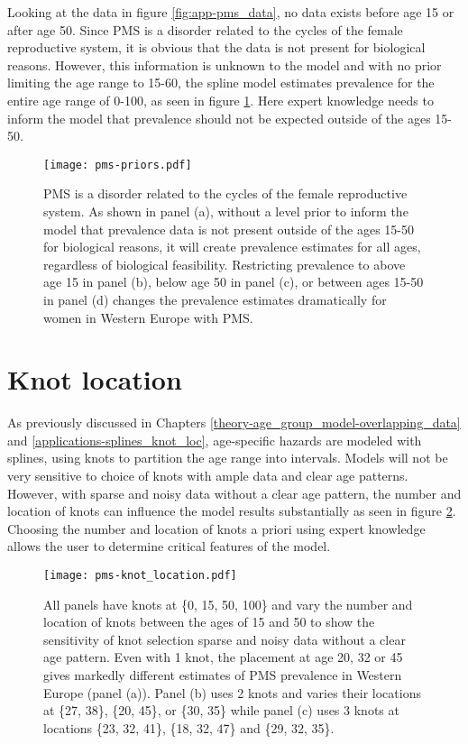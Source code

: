 Looking at the data in figure \ref{fig:app-pms_data}, no data exists before age 15 or after age 50.  Since PMS is a disorder related to the cycles of the female reproductive system, it is obvious that the data is not present for biological reasons.  However, this information is unknown to the model and with no prior limiting the age range to 15-60, the spline model estimates prevalence for the entire age range of 0-100, as seen in figure \ref{fig:app-prios_on_level}.  Here expert knowledge needs to inform the model that prevalence should not be expected outside of the ages 15-50.

    \begin{figure}
        \begin{center}
            \texttt{[image: pms-priors.pdf]}
        \end{center}
        \caption{PMS is a disorder related to the cycles of the female reproductive system.  As shown in panel (a), without a level prior to inform the model that prevalence data is not present outside of the ages 15-50 for biological reasons, it will create prevalence estimates for all ages, regardless of biological feasibility.  Restricting prevalence to above age 15 in panel (b), below age 50 in panel (c), or between ages 15-50 in panel (d) changes the prevalence estimates dramatically for women in Western Europe with PMS.}
        \label{fig:app-prios_on_level}
    \end{figure}

\section{Knot location}
As previously discussed in Chapters \ref{theory-age_group_model-overlapping_data} and \ref{applications-splines_knot_loc}, age-specific hazards are modeled with splines, using knots to partition the age range into intervals.  Models will not be very sensitive to choice of knots with ample data and clear age patterns.  However, with sparse and noisy data without a clear age pattern, the number and location of knots can influence the model results substantially as seen in figure \ref{fig:app-knot_loc}.  Choosing the number and location of knots a priori using expert knowledge allows the user to determine critical features of the model.

    \begin{figure}
        \begin{center}
            \texttt{[image: pms-knot\_location.pdf]}
        \end{center}
        \caption{All panels have knots at \{0, 15, 50, 100\} and vary the number and location of knots between the ages of 15 and 50 to show the sensitivity of knot selection sparse and noisy data without a clear age pattern. Even with 1 knot, the placement at age 20, 32 or 45 gives markedly different estimates of PMS prevalence in Western Europe (panel (a)).  Panel (b) uses 2 knots and varies their locations at \{27, 38\}, \{20, 45\}, or \{30, 35\} while panel (c) uses 3 knots at locations \{23, 32, 41\}, \{18, 32, 47\} and \{29, 32, 35\}.}
        \label{fig:app-knot_loc}
    \end{figure}

